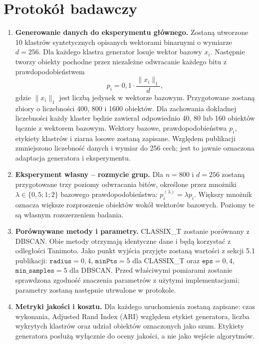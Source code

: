 \documentclass[10pt]{article}
\begin{document}
\pagebreak
\section{Protokół badawczy}
\begin{singlespace}\small
\begin{enumerate}
  \item \textbf{Generowanie danych do eksperymentu głównego.} Zostaną utworzone 10 klastrów syntetycznych opisanych wektorami binarnymi o wymiarze $d=256$. Dla każdego klastra generator losuje wektor bazowy $x_i$. Następnie tworzy obiekty pochodne przez niezależne odwracanie każdego bitu z prawdopodobieństwem
  \[
  p_i=0{,}1\cdot\frac{\|x_i\|_1}{d},
  \]
  gdzie $\|x_i\|_1$ jest liczbą jedynek w wektorze bazowym. Przygotowane zostaną zbiory o liczebności 400, 800 i 1600 obiektów. Dla zachowania dokładnej liczebności każdy klaster będzie zawierał odpowiednio 40, 80 lub 160 obiektów łącznie z wektorem bazowym. Wektory bazowe, prawdopodobieństwa $p_i$, etykiety klastrów i ziarna losowe zostaną zapisane. Względem publikacji zmniejszono liczebność danych i wymiar do 256 cech; jest to jawnie oznaczona adaptacja generatora i eksperymentu.
  \item \textbf{Eksperyment własny -- rozmycie grup.} Dla $n=800$ i $d=256$ zostaną przygotowane trzy poziomy odwracania bitów, określone przez mnożniki $\lambda\in\{0{,}5;1;2\}$ bazowego prawdopodobieństwa: $p_i^{(\lambda)}=\lambda p_i$. Większy mnożnik oznacza większe rozproszenie obiektów wokół wektorów bazowych. Poziomy te są własnym rozszerzeniem badania.
  \item \textbf{Porównywane metody i parametry.} CLASSIX\_T zostanie porównany z DBSCAN. Obie metody otrzymają identyczne dane i będą korzystać z odległości Tanimoto. Jako punkt wyjścia przyjęte zostaną wartości z sekcji 5.1 publikacji: $\texttt{radius}=0{,}4$, $\texttt{minPts}=5$ dla CLASSIX\_T oraz $\texttt{eps}=0{,}4$, $\texttt{min\_samples}=5$ dla DBSCAN. Przed właściwymi pomiarami zostanie sprawdzona zgodność znaczenia parametrów z użytymi implementacjami; parametry zostaną następnie utrwalone w protokole.
  \item \textbf{Metryki jakości i kosztu.} Dla każdego uruchomienia zostaną zapisane: czas wykonania, Adjusted Rand Index (ARI) względem etykiet generatora, liczba wykrytych klastrów oraz udział obiektów oznaczonych jako szum. Etykiety generatora posłużą wyłącznie do oceny jakości, a nie jako wejście algorytmów.

\end{enumerate}
\end{singlespace}
\end{document}
